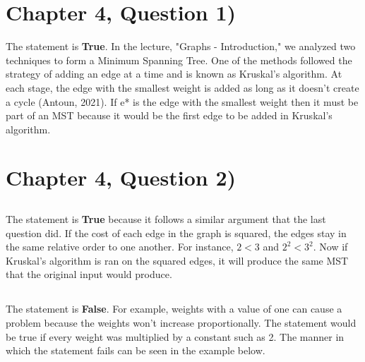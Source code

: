\documentclass[11pt]{article}
\begin{document}
\section{Chapter 4, Question 1)}
The statement is \textbf{True}. In the lecture, "Graphs - Introduction," we analyzed two techniques to form a Minimum Spanning Tree. One of the methods followed the strategy of adding an edge at a time and is known as Kruskal's algorithm. At each stage, the edge with the smallest weight is added as long as it doesn't create a cycle  (Antoun, 2021). If e* is the edge with the smallest weight then it must be part of an MST because it would be the first edge to be added in Kruskal's algorithm.

\section{Chapter 4, Question 2)}
\subsection{}
The statement is \textbf{True} because it follows a similar argument that the last question did. If the cost of each edge in the graph is squared, the edges stay in the same relative order to one another. For instance, $ 2 < 3 $ and $ 2^{2} < 3^{2} $. Now if Kruskal's algorithm is ran on the squared edges, it will produce the same MST that the original input would produce.
\subsection{}
The statement is \textbf{False}. For example, weights with a value of one can cause a problem because the weights won't increase proportionally. The statement would be true if every weight was multiplied by a constant such as 2. The manner in which the statement fails can be seen in the example below. 
\end{document}
